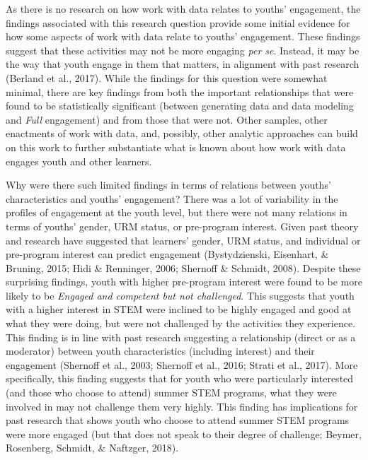 \documentclass[]{msu-thesis}
\theoremstyle{definition}
\theoremstyle{definition}
\theoremstyle{definition}
\theoremstyle{remark}
\begin{document}
As there is no research on how work with data relates to youths'
engagement, the findings associated with this research question provide
some initial evidence for how some aspects of work with data relate to
youths' engagement. These findings suggest that these activities may not
be more engaging \emph{per se}. Instead, it may be the way that youth
engage in them that matters, in alignment with past research (Berland et
al., 2017). While the findings for this question were somewhat minimal,
there are key findings from both the important relationships that were
found to be statistically significant (between generating data and data
modeling and \emph{Full} engagement) and from those that were not. Other
samples, other enactments of work with data, and, possibly, other
analytic approaches can build on this work to further substantiate what
is known about how work with data engages youth and other learners.

Why were there such limited findings in terms of relations between
youths' characteristics and youths' engagement? There was a lot of
variability in the profiles of engagement at the youth level, but there
were not many relations in terms of youths' gender, URM status, or
pre-program interest. Given past theory and research have suggested that
learners' gender, URM status, and individual or pre-program interest can
predict engagement (Bystydzienski, Eisenhart, \& Bruning, 2015; Hidi \&
Renninger, 2006; Shernoff \& Schmidt, 2008). Despite these surprising
findings, youth with higher pre-program interest were found to be more
likely to be \emph{Engaged and competent but not challenged}. This
suggests that youth with a higher interest in STEM were inclined to be
highly engaged and good at what they were doing, but were not challenged
by the activities they experience. This finding is in line with past
research suggesting a relationship (direct or as a moderator) between
youth characteristics (including interest) and their engagement
(Shernoff et al., 2003; Shernoff et al., 2016; Strati et al., 2017).
More specifically, this finding suggests that for youth who were
particularly interested (and those who choose to attend) summer STEM
programs, what they were involved in may not challenge them very highly.
This finding has implications for past research that shows youth who
choose to attend summer STEM programs were more engaged (but that does
not speak to their degree of challenge; Beymer, Rosenberg, Schmidt, \&
Naftzger, 2018).
\end{document}
